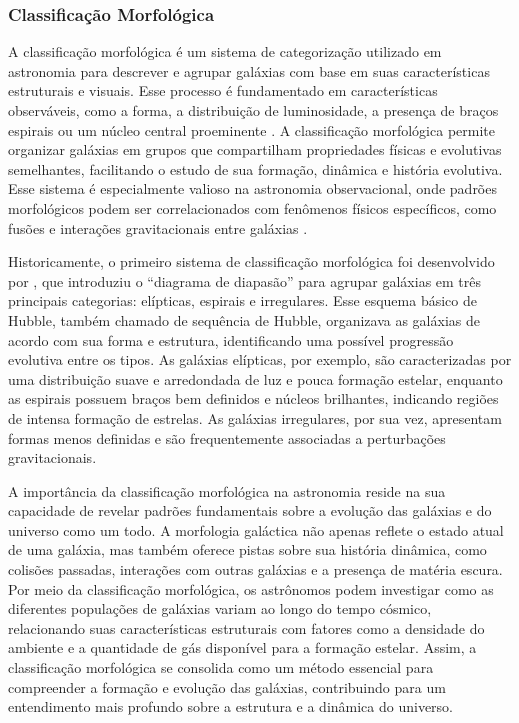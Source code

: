 \subsubsection{Classificação Morfológica}
\label{sec:classificao}

A classificação morfológica é um sistema de categorização utilizado em astronomia para descrever e agrupar galáxias com base em suas características estruturais e visuais. Esse processo é fundamentado em características observáveis, como a forma, a distribuição de luminosidade, a presença de braços espirais ou um núcleo central proeminente \cite{steinmetz2002galaxy}. A classificação morfológica permite organizar galáxias em grupos que compartilham propriedades físicas e evolutivas semelhantes, facilitando o estudo de sua formação, dinâmica e história evolutiva. Esse sistema é especialmente valioso na astronomia observacional, onde padrões morfológicos podem ser correlacionados com fenômenos físicos específicos, como fusões e interações gravitacionais entre galáxias \cite{van1998galaxy}.

Historicamente, o primeiro sistema de classificação morfológica foi desenvolvido por , que introduziu o ``diagrama de diapasão'' para agrupar galáxias em três principais categorias: elípticas, espirais e irregulares. Esse esquema básico de Hubble, também chamado de sequência de Hubble, organizava as galáxias de acordo com sua forma e estrutura, identificando uma possível progressão evolutiva entre os tipos. As galáxias elípticas, por exemplo, são caracterizadas por uma distribuição suave e arredondada de luz e pouca formação estelar, enquanto as espirais possuem braços bem definidos e núcleos brilhantes, indicando regiões de intensa formação de estrelas. As galáxias irregulares, por sua vez, apresentam formas menos definidas e são frequentemente associadas a perturbações gravitacionais.

A importância da classificação morfológica na astronomia reside na sua capacidade de revelar padrões fundamentais sobre a evolução das galáxias e do universo como um todo. A morfologia galáctica não apenas reflete o estado atual de uma galáxia, mas também oferece pistas sobre sua história dinâmica, como colisões passadas, interações com outras galáxias e a presença de matéria escura. Por meio da classificação morfológica, os astrônomos podem investigar como as diferentes populações de galáxias variam ao longo do tempo cósmico, relacionando suas características estruturais com fatores como a densidade do ambiente e a quantidade de gás disponível para a formação estelar. Assim, a classificação morfológica se consolida como um método essencial para compreender a formação e evolução das galáxias, contribuindo para um entendimento mais profundo sobre a estrutura e a dinâmica do universo.



